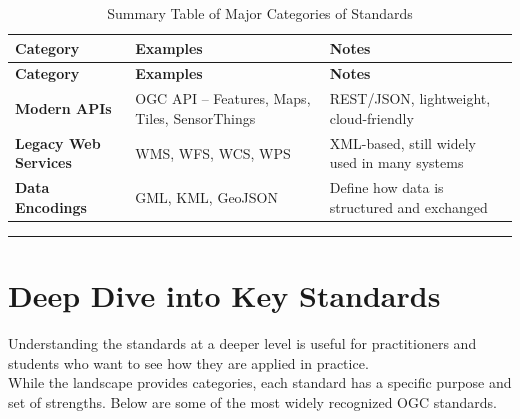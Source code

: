\documentclass[
  11pt,
  letterpaper,
]{book}
\begin{document}
\begin{longtable}[]{@{}
  >{\raggedright\arraybackslash}p{}
  >{\raggedright\arraybackslash}p{}
  >{\raggedright\arraybackslash}p{}@{}}
\caption{Summary Table of Major Categories of
Standards}\label{tbl-standards}\tabularnewline
\toprule\noalign{}
\begin{minipage}[b]{\linewidth}\raggedright
\textbf{Category}
\end{minipage} & \begin{minipage}[b]{\linewidth}\raggedright
\textbf{Examples}
\end{minipage} & \begin{minipage}[b]{\linewidth}\raggedright
\textbf{Notes}
\end{minipage} \\
\midrule\noalign{}
\endfirsthead
\toprule\noalign{}
\begin{minipage}[b]{\linewidth}\raggedright
\textbf{Category}
\end{minipage} & \begin{minipage}[b]{\linewidth}\raggedright
\textbf{Examples}
\end{minipage} & \begin{minipage}[b]{\linewidth}\raggedright
\textbf{Notes}
\end{minipage} \\
\midrule\noalign{}
\endhead
\bottomrule\noalign{}
\endlastfoot
\textbf{Modern APIs} & OGC API -- Features, Maps, Tiles, SensorThings &
REST/JSON, lightweight, cloud-friendly \\
\textbf{Legacy Web Services} & WMS, WFS, WCS, WPS & XML-based, still
widely used in many systems \\
\textbf{Data Encodings} & GML, KML, GeoJSON & Define how data is
structured and exchanged \\
\end{longtable}

\begin{center}\rule{0.5\linewidth}{0.5pt}\end{center}

\section{Deep Dive into Key
Standards}\label{deep-dive-into-key-standards}

Understanding the standards at a deeper level is useful for
practitioners and students who want to see how they are applied in
practice.\\
While the landscape provides categories, each standard has a specific
purpose and set of strengths. Below are some of the most widely
recognized OGC standards.
\end{document}
